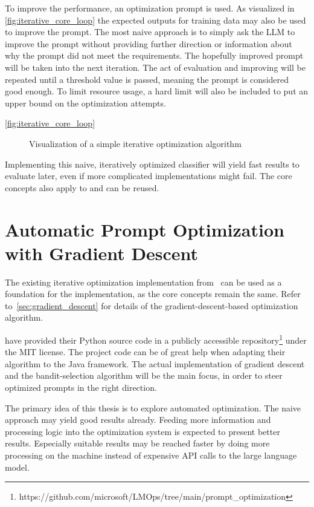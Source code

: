 To improve the performance, an optimization prompt is used.
As visualized in \autoref{fig:iterative_core_loop} the expected outputs for training data may also be used to improve the prompt.
The most naive approach is to simply ask the LLM to improve the prompt without providing further direction or information about why the prompt did not meet the requirements.
The hopefully improved prompt will be taken into the next iteration.
The act of evaluation and improving will be repeated until a threshold value is passed, meaning the prompt is considered good enough.
To limit resource usage, a hard limit will also be included to put an upper bound on the optimization attempts.

\autoref{fig:iterative_core_loop} 

\begin{figure}
    \centering
    
    \caption{Visualization of a simple iterative optimization algorithm}
    \label{fig:iterative_core_loop}
\end{figure}

Implementing this naive, iteratively optimized classifier will yield fast results to evaluate later, even if more complicated implementations might fail.
The core concepts also apply to  and can be reused.


\section{Automatic Prompt Optimization with Gradient Descent}
\label{approach:sec:gradient_descent}
The existing iterative optimization implementation from~ can be used as a foundation for the implementation, as the core concepts remain the same.
Refer to~\autoref{sec:gradient_descent} for details of the gradient-descent-based optimization algorithm.

 have provided their Python source code in a publicly accessible repository\footnote{https://github.com/microsoft/LMOps/tree/main/prompt\_optimization} under the MIT license.
The project code can be of great help when adapting their algorithm to the \LiSSA Java framework.
The actual implementation of gradient descent and the bandit-selection algorithm will be the main focus, in order to steer optimized prompts in the right direction.

The primary idea of this thesis is to explore automated optimization.
The naive approach may yield good results already.
Feeding more information and processing logic into the optimization system is expected to present better results.
Especially suitable results may be reached faster by doing more processing on the machine instead of expensive API calls to the large language model.